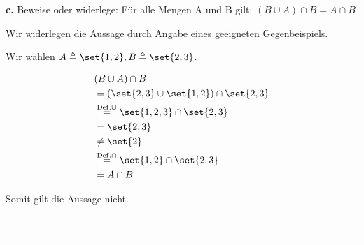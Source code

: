 \documentclass[10pt,leqno ]{article}
\DeclarePairedDelimiter\set\{\}
\theoremstyle{definition}
\newenvironment{solution}[1][L]{\begin{doublespace}\textbf{#1.}\quad }{\ \rule{0.5em}{0.5em}\end{doublespace}}
\begin{document}
\begin{solution}[c]
Beweise oder widerlege: Für alle Mengen A und B gilt: \( (B \cup A) \cap B = A \cap B \)

Wir widerlegen die Aussage durch Angabe eines geeigneten Gegenbeispiels.

Wir wählen \( A \triangleq \set{1,2}, B \triangleq \set{2,3} \).

\begin{align*}
    & (B \cup A) \cap B  \\
    &= (\set{2,3} \cup \set{1,2}) \cap \set{2,3}  \\
    & \overset{\mathrm{Def. \cup}}{=} \set{1,2,3} \cap \set{2,3}  \\
    &= \set{2,3} \\
    & \neq \set{2}  \\
    & \overset{\mathrm{Def. \cap}}{=} \set{1,2} \cap \set{2,3}  \\
    &= A \cap B \\
\end{align*}

Somit gilt die Aussage nicht.

\end{solution}
\end{document}
